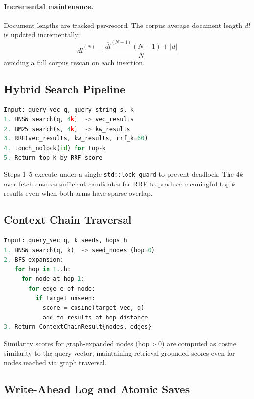 \documentclass[11pt,twocolumn]{article}
\begin{document}
\paragraph{Incremental maintenance.} Document lengths are tracked per-record.
The corpus average document length $\overline{dl}$ is updated incrementally:
\begin{equation}
  \overline{dl}^{(N)} = \frac{\overline{dl}^{(N-1)}(N-1) + |d|}{N}
\end{equation}
avoiding a full corpus rescan on each insertion.

\subsection{Hybrid Search Pipeline}

\begin{lstlisting}[language=Python,caption={Hybrid search pseudocode}]
Input: query_vec q, query_string s, k
1. HNSW search(q, 4k)  -> vec_results
2. BM25 search(s, 4k)  -> kw_results
3. RRF(vec_results, kw_results, rrf_k=60)
4. touch_nolock(id) for top-k
5. Return top-k by RRF score
\end{lstlisting}

Steps 1--5 execute under a single \texttt{std::lock\_guard} to prevent deadlock.
The $4k$ over-fetch ensures sufficient candidates for RRF to produce meaningful
top-$k$ results even when both arms have sparse overlap.

\subsection{Context Chain Traversal}

\begin{lstlisting}[language=Python,caption={Context chain pseudocode}]
Input: query_vec q, k seeds, hops h
1. HNSW search(q, k)  -> seed_nodes (hop=0)
2. BFS expansion:
   for hop in 1..h:
     for node at hop-1:
       for edge e of node:
         if target unseen:
           score = cosine(target_vec, q)
           add to results at hop distance
3. Return ContextChainResult{nodes, edges}
\end{lstlisting}

Similarity scores for graph-expanded nodes ($\text{hop} > 0$) are computed as
cosine similarity to the query vector, maintaining retrieval-grounded scores even
for nodes reached via graph traversal.

\subsection{Write-Ahead Log and Atomic Saves}
\end{document}
